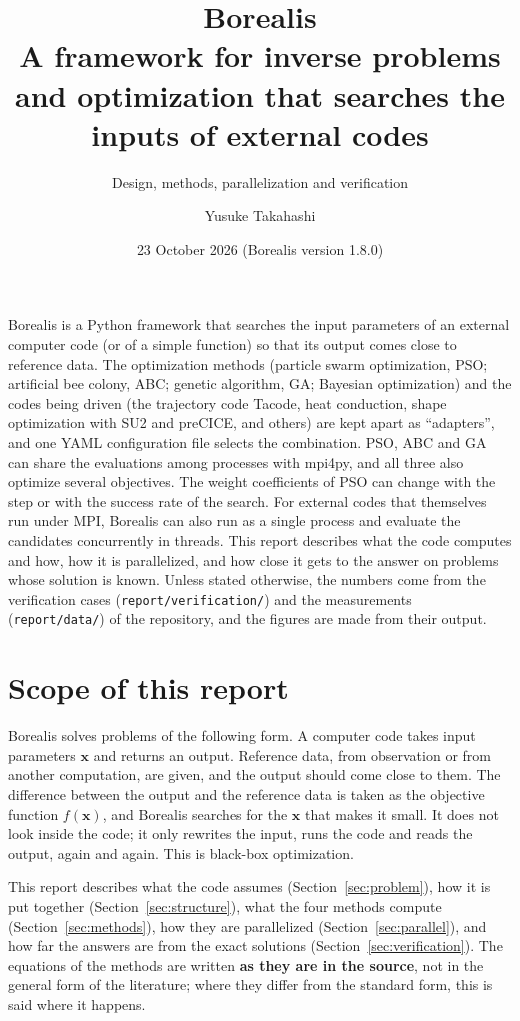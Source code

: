 \documentclass[11pt,a4paper]{article}
\title{Borealis\\[0.3\baselineskip]
\large A framework for inverse problems and optimization that searches the inputs of external codes}
\subtitle{Design, methods, parallelization and verification}
\author{Yusuke Takahashi}
\date{23 October 2026 (Borealis version 1.8.0)}
\affiliation{Hokkaido University}
\begin{document}
\maketitle
\begin{borealisabstract}
Borealis is a Python framework that searches the input parameters of an external computer code (or of a simple function) so that its output comes close to reference data. The optimization methods (particle swarm optimization, PSO; artificial bee colony, ABC; genetic algorithm, GA; Bayesian optimization) and the codes being driven (the trajectory code Tacode, heat conduction, shape optimization with SU2 and preCICE, and others) are kept apart as ``adapters'', and one YAML configuration file selects the combination. PSO, ABC and GA can share the evaluations among processes with mpi4py, and all three also optimize several objectives. The weight coefficients of PSO can change with the step or with the success rate of the search. For external codes that themselves run under MPI, Borealis can also run as a single process and evaluate the candidates concurrently in threads. This report describes what the code computes and how, how it is parallelized, and how close it gets to the answer on problems whose solution is known. Unless stated otherwise, the numbers come from the verification cases (\texttt{report/verification/}) and the measurements (\texttt{report/data/}) of the repository, and the figures are made from their output.
\end{borealisabstract}
\tableofcontents
\vspace{1em}

\section{Scope of this report}

Borealis solves problems of the following form. A computer code takes input parameters $\mathbf{x}$ and returns an output. Reference data, from observation or from another computation, are given, and the output should come close to them. The difference between the output and the reference data is taken as the objective function $f(\mathbf{x})$, and Borealis searches for the $\mathbf{x}$ that makes it small. It does not look inside the code; it only rewrites the input, runs the code and reads the output, again and again. This is black-box optimization.

This report describes what the code assumes (Section~\ref{sec:problem}), how it is put together (Section~\ref{sec:structure}), what the four methods compute (Section~\ref{sec:methods}), how they are parallelized (Section~\ref{sec:parallel}), and how far the answers are from the exact solutions (Section~\ref{sec:verification}). The equations of the methods are written \textbf{as they are in the source}, not in the general form of the literature; where they differ from the standard form, this is said where it happens.
\end{document}
